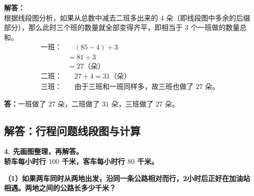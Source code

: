 \vspace{0.6cm}

\textbf{解答：}\\
根据线段图分析，如果从总数中减去二班多出来的 $4$ 朵（即线段图中多余的后缀部分），那么此时三个班的数量就全部变得齐平，即相当于 $3$ 个一班做的数量总和。
\begin{align*}
\text{一班：}& \quad (85 - 4) \div 3 \\
      & = 81 \div 3 \\
      & = 27\text{（朵）} \\[6pt]
\text{二班：}& \quad 27 + 4 = 31\text{（朵）} \\[6pt]
\text{三班：}& \quad \text{由于三班和一班同样多，故三班也做了 } 27\text{ 朵。}
\end{align*}

\noindent\textbf{答：}一班做了 $27$ 朵，二班做了 $31$ 朵，三班做了 $27$ 朵。

\newpage

\newpage

\subsection{解答：行程问题线段图与计算}

\vspace{0.4cm}

\noindent\textbf{4. 先画图整理，再解答。}\\
\textbf{轿车每小时行 $100$ 千米，客车每小时行 $80$ 千米。}

\vspace{0.4cm}

\noindent\textbf{（1）如果两车同时从两地出发，沿同一条公路相对而行，2小时后正好在加油站相遇。两地之间的公路长多少千米？}

\vspace{0.8cm}

